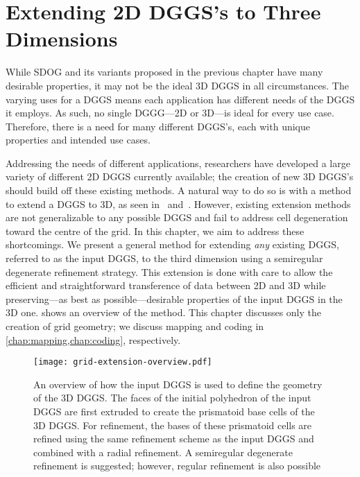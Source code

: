 \chapter{Extending 2D DGGS's to Three Dimensions} \label{chap:extension}
While SDOG and its variants proposed in the previous chapter have many desirable properties, it may not be the ideal 3D DGGS in all circumstances.
The varying uses for a DGGS means each application has different needs of the DGGS it employs.
As such, no single DGGG---2D or 3D---is ideal for every use case.
Therefore, there is a need for many different DGGS's, each with unique properties and intended use cases.


Addressing the needs of different applications, researchers have developed a large variety of different 2D DGGS currently available; the creation of new 3D DGGS's should build off these existing methods.
A natural way to do so is with a method to extend a DGGS to 3D, as seen in~\cite{xie2013interactive} and~\cite{sirdeshmukh2019utilizing}.
However, existing extension methods are not generalizable to any possible DGGS and fail to address cell degeneration toward the centre of the grid.
In this chapter, we aim to address these shortcomings.
We present a general method for extending \textit{any} existing DGGS, referred to as the input DGGS, to the third dimension using a semiregular degenerate refinement strategy.
This extension is done with care to allow the efficient and straightforward transference of data between 2D and 3D while preserving---as best as possible---desirable properties of the input DGGS in the 3D one.
 shows an overview of the method.
This chapter discusses only the creation of grid geometry; we discuss mapping and coding in \cref{chap:mapping,chap:coding}, respectively.


\begin{figure}[ht!]
	\centering
	\texttt{[image: grid-extension-overview.pdf]}
	\caption[Overview of the grid extension method]{
		An overview of how the input DGGS is used to define the geometry of the 3D DGGS.
		The faces of the initial polyhedron of the input DGGS are first extruded to create the prismatoid base cells of the 3D DGGS.
		For refinement, the bases of these prismatoid cells are refined using the same refinement scheme as the input DGGS and combined with a radial refinement.
		A semiregular degenerate refinement is suggested; however, regular refinement is also possible
	}
	\label{fig:extension}
\end{figure}


